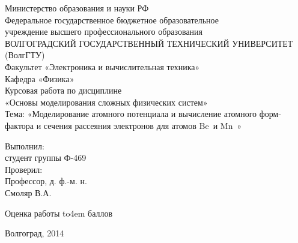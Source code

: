 \documentclass[a4paper,12pt]{extarticle}
\newcommand{\fiat}{\ensuremath{\mathrm{Be}}~}
\newcommand{\seat}{\ensuremath{\mathrm{Mn}}~}
\begin{document}
\begin{titlepage}
\vskip 6cm
\vskip 4cm
\begin{center}
Министерство образования и науки РФ\\
Федеральное государственное бюджетное образовательное\\
учреждение высшего профессионального образования\\
ВОЛГОГРАДСКИЙ ГОСУДАРСТВЕННЫЙ ТЕХНИЧЕСКИЙ УНИВЕРСИТЕТ\\
(ВолгГТУ)\\
Факультет «Электроника и вычислительная техника»\\
Кафедра «Физика»\\
\vskip 2cm
Курсовая работа по дисциплине \\
«Основы моделирования сложных физических систем»\\
Тема: «Моделирование атомного потенциала и вычисление атомного форм-фактора и
сечения рассеяния электронов для атомов \fiat и \seat»\\
\end{center}
\vskip 2cm
\begin{flushright}
\parbox{6cm}{
Выполнил:\\
студент группы Ф-469\\
Проверил:\\
Профессор, д. ф.-м. н.\\
Смоляр В.А.\\}
\vskip 2cm
\end{flushright}
\begin{center}
\def\hrf#1{\hbox to#1{\hrulefill}}
Оценка работы \hrf{4em} баллов
\end{center}
\begin{center}
\vskip 3cm
Волгоград, 2014
\end{center}


\end{titlepage}
\end{document}
